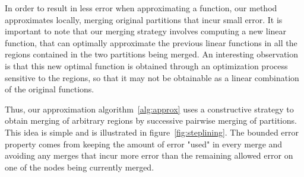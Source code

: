 In order to result in less error when approximating a function, our
method approximates locally, merging original partitions that incur
small error. It is important to note that our merging strategy
involves computing a new linear function, that can optimally
approximate the previous linear functions in all the regions contained
in the two partitions being merged. An interesting observation is that
this new optimal function is obtained through an optimization process
sensitive to the regions, so that it may not be obtainable as a linear
combination of the original functions.

Thus, our approximation algorithm~\ref{alg:approx} uses a constructive strategy to obtain merging of arbitrary regions by successive pairwise merging of partitions. This idea is simple and is illustrated in figure~\ref{fig:steplining}. The bounded error property comes from keeping the amount of error "used" in every merge and avoiding any merges that incur more error than the remaining allowed error on one of the nodes being currently merged.

